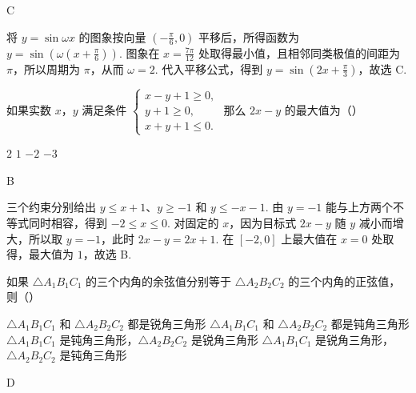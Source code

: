 \begin{answer}
C
\end{answer}

\begin{solution}
将 \(y=\sin\omega x\) 的图象按向量 \(\left(-\frac\pi6,0\right)\) 平移后，所得函数为 \(y=\sin\left(\omega\left(x+\frac\pi6\right)\right)\). 图象在 \(x=\frac{7\pi}{12}\) 处取得最小值，且相邻同类极值的间距为 \(\pi\)，所以周期为 \(\pi\)，从而 \(\omega=2\). 代入平移公式，得到 \(y=\sin\left(2x+\frac\pi3\right)\)，故选 C.
\end{solution}

\begin{problem}
如果实数 \(x\)，\(y\) 满足条件 \(\begin{cases}
x - y + 1 \geqslant 0,\\
y + 1 \geqslant 0,\\
x + y + 1 \leqslant 0.
\end{cases}\) 那么 \(2x - y\) 的最大值为（\quad）

\choices
    {\(2\)}
    {\(1\)}
    {\(-2\)}
    {\(-3\)}
\end{problem}

\begin{answer}
B
\end{answer}

\begin{solution}
三个约束分别给出 \(y\leq x+1\)、\(y\geq-1\) 和 \(y\leq-x-1\). 由 \(y=-1\) 能与上方两个不等式同时相容，得到 \(-2\leq x\leq0\). 对固定的 \(x\)，因为目标式 \(2x-y\) 随 \(y\) 减小而增大，所以取 \(y=-1\)，此时 \(2x-y=2x+1\). 在 \([-2,0]\) 上最大值在 \(x=0\) 处取得，最大值为 \(1\)，故选 B.
\end{solution}

\begin{problem}
如果 \(\triangle A_{1}B_{1}C_{1}\) 的三个内角的余弦值分别等于 \(\triangle A_{2}B_{2}C_{2}\) 的三个内角的正弦值，则（\quad）

\choices
    {\(\triangle A_{1}B_{1}C_{1}\) 和 \(\triangle A_{2}B_{2}C_{2}\) 都是锐角三角形}
    {\(\triangle A_{1}B_{1}C_{1}\) 和 \(\triangle A_{2}B_{2}C_{2}\) 都是钝角三角形}
    {\(\triangle A_{1}B_{1}C_{1}\) 是钝角三角形，\(\triangle A_{2}B_{2}C_{2}\) 是锐角三角形}
    {\(\triangle A_{1}B_{1}C_{1}\) 是锐角三角形，\(\triangle A_{2}B_{2}C_{2}\) 是钝角三角形}
\end{problem}

\begin{answer}
D
\end{answer}

